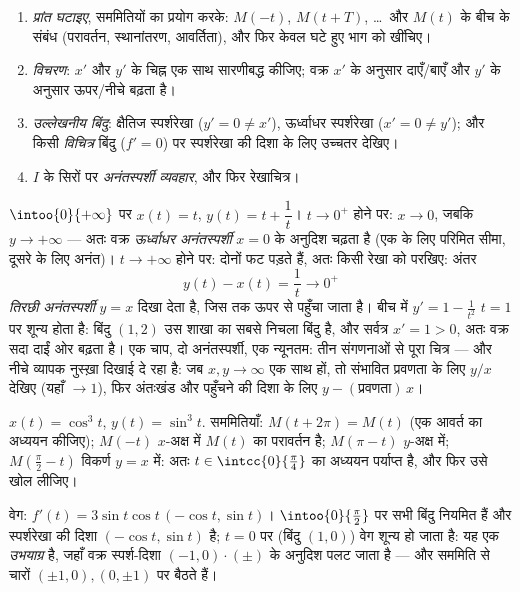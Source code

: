\begin{method}[किसी प्राचलित वक्र का अध्ययन]\label{met:b1:curves:study}
\begin{enumerate}
  \item \emph{प्रांत घटाइए}, सममितियों का प्रयोग करके: $M(-t)$, $M(t + T)$,
  \dots\ और $M(t)$ के बीच के संबंध (परावर्तन, स्थानांतरण, आवर्तिता), और फिर
  केवल घटे हुए भाग को खींचिए।
  \item \emph{विचरण}: $x'$ और $y'$ के चिह्न एक साथ सारणीबद्ध कीजिए; वक्र
  $x'$ के अनुसार दाएँ/बाएँ और $y'$ के अनुसार ऊपर/नीचे बढ़ता है।
  \item \emph{उल्लेखनीय बिंदु}: क्षैतिज स्पर्शरेखा ($y' = 0 \neq x'$),
  ऊर्ध्वाधर स्पर्शरेखा ($x' = 0 \neq y'$); और किसी \emph{विचित्र} बिंदु ($f'
  = 0$) पर स्पर्शरेखा की दिशा के लिए उच्चतर  देखिए।
  \item $I$ के सिरों पर \emph{अनंतस्पर्शी व्यवहार}, और फिर रेखाचित्र।
\end{enumerate}
\end{method}

\begin{example}[अनंतस्पर्शी शाखाएँ, हल करके]
\label{ex:b1:curves:asymptotes}
$\intoo{0}{+\infty}$ पर $x(t) = t$, $y(t) = t + \dfrac1t$। $t \to 0^{+}$
होने पर: $x \to 0$, जबकि $y \to +\infty$ --- अतः वक्र \emph{ऊर्ध्वाधर
अनंतस्पर्शी} $x = 0$ के अनुदिश चढ़ता है (एक  के लिए परिमित सीमा,
दूसरे के लिए अनंत)। $t \to +\infty$ होने पर: दोनों  फट पड़ते हैं,
अतः किसी रेखा को परखिए: अंतर
\[
y(t) - x(t) = \frac1t \longrightarrow 0^{+}
\]
\emph{तिरछी अनंतस्पर्शी} $y = x$ दिखा देता है, जिस तक ऊपर से पहुँचा जाता है।
बीच में $y' = 1 - \frac1{t^2}$ $t = 1$ पर शून्य होता है: बिंदु $(1, 2)$ उस
शाखा का सबसे निचला बिंदु है, और सर्वत्र $x' = 1 > 0$, अतः वक्र सदा दाईं ओर
बढ़ता है। एक चाप, दो अनंतस्पर्शी, एक न्यूनतम: तीन संगणनाओं से पूरा चित्र ---
और नीचे व्यापक नुस्ख़ा दिखाई दे रहा है: जब $x, y \to \infty$ एक साथ हों, तो
संभावित प्रवणता के लिए $y/x$ देखिए (यहाँ $\to 1$), फिर अंतःखंड और पहुँचने की
दिशा के लिए $y - (\text{प्रवणता})\,x$।
\end{example}

\begin{example}[ऐस्ट्रॉयड]\label{ex:b1:curves:astroid}
$x(t) = \cos^3 t$, $y(t) = \sin^3 t$. सममितियाँ: $M(t +
2\pi) = M(t)$ (एक आवर्त का अध्ययन कीजिए); $M(-t)$ $x$-अक्ष में $M(t)$ का
परावर्तन है; $M(\pi - t)$ $y$-अक्ष में; $M(\frac\pi2 - t)$ विकर्ण $y = x$
में: अतः $t \in \intcc{0}{\frac\pi4}$ का अध्ययन पर्याप्त है, और फिर उसे खोल
लीजिए।

वेग: $f'(t) = 3\sin t\cos t\,(-\cos t, \sin t)$। $\intoo{0}{\frac\pi2}$ पर
सभी बिंदु नियमित हैं और स्पर्शरेखा की दिशा $(-\cos t, \sin t)$ है; $t = 0$
पर (बिंदु $(1,0)$) वेग शून्य हो जाता है: यह एक \emph{उभयाग्र}
है, जहाँ वक्र स्पर्श-दिशा $(-1, 0)\cdot(\pm)$ के अनुदिश पलट जाता है --- और
सममिति से चारों  $(\pm1, 0), (0, \pm1)$ पर बैठते हैं।
\end{example}

